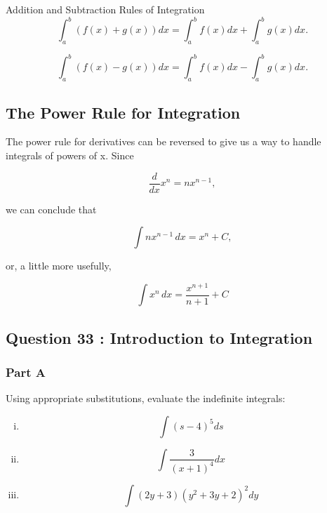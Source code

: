 \documentclass[]{article}
\begin{document}
%


Addition and Subtraction Rules of Integration
\[\int_a^b (f(x) + g(x)) dx = \int_a^b f(x) dx + \int_a^b g(x) dx.\]

\[\int_a^b (f(x) - g(x)) dx = \int_a^b f(x) dx - \int_a^b g(x) dx.\]


%
%
%
%

\subsection*{The Power Rule for Integration}
The power rule for derivatives can be reversed to give us a way to handle integrals of powers of x. Since

\[\frac{d}{dx} x^n = n x^{n-1},\]

we can conclude that

\[\int n x^{n-1} \, dx = x^n + C,\]

or, a little more usefully,

\[\int x^n \, dx = \frac{x^{n+1}}{n+1} + C\]
\subsection*{Question 33 : Introduction to Integration}

\subsubsection*{Part A}
Using appropriate substitutions, evaluate the indefinite integrals:

\begin{multicols}{2}
	\begin{enumerate}[(i)]
		
		\item 
		\[ \int (s - 4)^5 ds \]
		\item 
		\[ \int 
		\frac{3}{(x + 1)^4 }dx\]
		\item 
		\[\int 
		(2y + 3)(y^2 + 3y + 2)^2 dy\]
		
	\end{enumerate}
\end{multicols}
\end{document}

